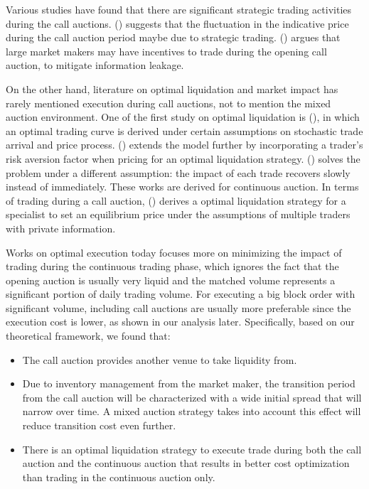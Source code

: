 Various studies have found that there are significant strategic trading activities during the call auctions. (\cite{Bruno1999}) suggests that the fluctuation in the indicative price during the call auction period maybe due to strategic trading. (\cite{Vives2001}) argues that large market makers may have incentives to trade during the opening call auction, to mitigate information leakage.

On the other hand, literature on optimal liquidation and market impact has rarely mentioned execution during call auctions, not to mention the mixed auction environment. One of the first study on optimal liquidation is (\cite{Ho1981}), in which an optimal trading curve is derived under certain assumptions on stochastic trade arrival and price process. (\cite{Almgren2000}) extends the model further by incorporating a trader's risk aversion factor when pricing for an optimal liquidation strategy. (\cite{Obizhaeva2013}) solves the problem under a different assumption: the impact of each trade recovers slowly instead of immediately. These works are derived for continuous auction. In terms of trading during a call auction, (\cite{Madhavan2015}) derives a optimal liquidation strategy for a specialist to set an equilibrium price under the assumptions of multiple traders with private information.

Works on optimal execution today focuses more on minimizing the impact of trading during the continuous trading phase, which ignores the fact that the opening auction is usually very liquid and the matched volume represents a significant portion of daily trading volume. For executing a big block order with significant volume, including call auctions are usually more preferable since the execution cost is lower, as shown in our analysis later. Specifically, based on our theoretical framework, we found that:

\begin{itemize}
  \item The call auction provides another venue to take liquidity from.
  \item Due to inventory management from the market maker, the transition period from the call auction will be characterized with a wide initial spread that will narrow over time. A mixed auction strategy takes into account this effect will reduce transition cost even further.
  \item There is an optimal liquidation strategy to execute trade during both the call auction and the continuous auction that results in better cost optimization than trading in the continuous auction only.
\end{itemize}

